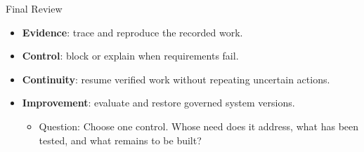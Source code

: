 \begin{frame}{Final Review\handsup}
\begin{itemize}
\item \textbf{Evidence}: trace and reproduce the recorded work.
\item \textbf{Control}: block or explain when requirements fail.
\item \textbf{Continuity}: resume verified work without repeating uncertain actions.
\item \textbf{Improvement}: evaluate and restore governed system versions.
\begin{itemize}
\item Question: Choose one control. Whose need does it address, what has been tested, and what remains to be built?
\end{itemize}
\end{itemize}
\end{frame}
